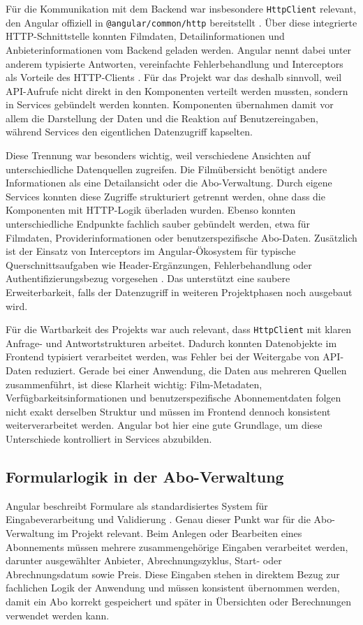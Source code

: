 F\"ur die Kommunikation mit dem Backend war insbesondere \texttt{HttpClient} relevant, den Angular offiziell in \texttt{@angular/common/http} bereitstellt \cite{angular_http}. \"Uber diese integrierte HTTP-Schnittstelle konnten Filmdaten, Detailinformationen und Anbieterinformationen vom Backend geladen werden. Angular nennt dabei unter anderem typisierte Antworten, vereinfachte Fehlerbehandlung und Interceptors als Vorteile des HTTP-Clients \cite{angular_http}. F\"ur das Projekt war das deshalb sinnvoll, weil API-Aufrufe nicht direkt in den Komponenten verteilt werden mussten, sondern in Services geb\"undelt werden konnten. Komponenten \"ubernahmen damit vor allem die Darstellung der Daten und die Reaktion auf Benutzereingaben, w\"ahrend Services den eigentlichen Datenzugriff kapselten.

Diese Trennung war besonders wichtig, weil verschiedene Ansichten auf unterschiedliche Datenquellen zugreifen. Die Film\"ubersicht ben\"otigt andere Informationen als eine Detailansicht oder die Abo-Verwaltung. Durch eigene Services konnten diese Zugriffe strukturiert getrennt werden, ohne dass die Komponenten mit HTTP-Logik \"uberladen wurden. Ebenso konnten unterschiedliche Endpunkte fachlich sauber geb\"undelt werden, etwa f\"ur Filmdaten, Providerinformationen oder benutzerspezifische Abo-Daten. Zus\"atzlich ist der Einsatz von Interceptors im Angular-\"Okosystem f\"ur typische Querschnittsaufgaben wie Header-Erg\"anzungen, Fehlerbehandlung oder Authentifizierungsbezug vorgesehen \cite{angular_http}. Das unterst\"utzt eine saubere Erweiterbarkeit, falls der Datenzugriff in weiteren Projektphasen noch ausgebaut wird.

F\"ur die Wartbarkeit des Projekts war auch relevant, dass \texttt{HttpClient} mit klaren Anfrage- und Antwortstrukturen arbeitet. Dadurch konnten Datenobjekte im Frontend typisiert verarbeitet werden, was Fehler bei der Weitergabe von API-Daten reduziert. Gerade bei einer Anwendung, die Daten aus mehreren Quellen zusammenf\"uhrt, ist diese Klarheit wichtig: Film-Metadaten, Verf\"ugbarkeitsinformationen und benutzerspezifische Abonnementdaten folgen nicht exakt derselben Struktur und m\"ussen im Frontend dennoch konsistent weiterverarbeitet werden. Angular bot hier eine gute Grundlage, um diese Unterschiede kontrolliert in Services abzubilden.

\subsection{Formularlogik in der Abo-Verwaltung}
Angular beschreibt Formulare als standardisiertes System f\"ur Eingabeverarbeitung und Validierung \cite{angular_overview,angular_forms}. Genau dieser Punkt war f\"ur die Abo-Verwaltung im Projekt relevant. Beim Anlegen oder Bearbeiten eines Abonnements m\"ussen mehrere zusammengeh\"orige Eingaben verarbeitet werden, darunter ausgew\"ahlter Anbieter, Abrechnungszyklus, Start- oder Abrechnungsdatum sowie Preis. Diese Eingaben stehen in direktem Bezug zur fachlichen Logik der Anwendung und m\"ussen konsistent \"ubernommen werden, damit ein Abo korrekt gespeichert und sp\"ater in \"Ubersichten oder Berechnungen verwendet werden kann.

